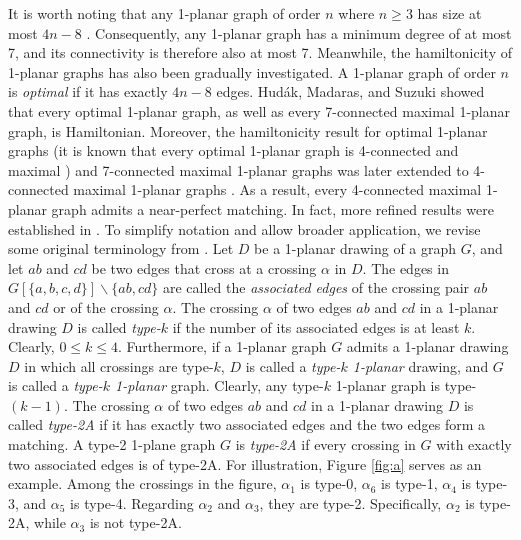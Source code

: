 \documentclass[12pt,a4paper]{article}
\begin{document}
 It is worth noting that  any 1-planar graph of order $n$ where $n \geq 3$ has size at most $4 n-8$  \cite{MR1606052}. Consequently, any 1-planar graph has a minimum degree of at most 7, and its connectivity is therefore also at most 7.  Meanwhile, the hamiltonicity of 1-planar graphs has also been gradually investigated.
A 1-planar graph of order $n$  is \emph{optimal} if it has exactly $4 n-8$ edges.  Hud\'{a}k, Madaras, and Suzuki \cite{MR2993519} showed that every optimal 1-planar graph, as well as every 7-connected maximal 1-planar graph, is Hamiltonian. Moreover, the hamiltonicity result for optimal 1-planar graphs (it is known that every optimal 1-planar graph is 4-connected and maximal \cite{MR2746706}) and 7-connected maximal 1-planar graphs was later extended to 4-connected maximal  1-planar  graphs \cite{MR4130388}. As a result, every 4-connected maximal 1-planar graph admits a near-perfect matching. In fact, more refined results were established in \cite{MR4130388}. To simplify notation and allow broader application, we revise some original terminology from \cite{MR4130388}. 
Let $D$ be a 1-planar drawing of a graph $G$, and let $ab$ and $cd$ be two edges that cross at a crossing $\alpha$ in $D$. The edges in $G[\{a, b, c, d\}] \backslash\{a b, c d\}$ are called the \emph{associated edges} of the crossing pair $a b$ and $c d$  or of the crossing $\alpha$. The crossing $\alpha$ of two edges $ab$ and $cd$ in a 1-planar drawing $D$ is called \emph{type-$k$} if the number of its associated edges is at least 
$k$.  Clearly,  $0\le k\le 4$. Furthermore, if a 1-planar graph $G$ admits a 1-planar drawing $D$ in which all crossings are type-$k$,  $D$ is called a \emph{type-$k$ 1-planar} drawing, and  $G$ is called a \emph{type-$k$ 1-planar} graph.  Clearly, any type-$k$ 1-planar graph is  type-$(k-1)$.    The crossing $\alpha$ of two edges $ab$ and $cd$ in a 1-planar drawing $D$ is called \emph{type-2A} if it has exactly two associated edges and the two edges form a matching. A type-2 1-plane graph $G$ is \emph{type-2A} if every crossing in $G$ with exactly two associated edges is of type-2A. For illustration, Figure \ref{fig:a} serves as an example.  Among the crossings in the figure, $\alpha_1$ is type-0, $\alpha_6$ is type-1, $\alpha_4$ is   type-3, and $\alpha_5$ is type-4. Regarding $\alpha_2$ and $\alpha_3$, they are  type-2. Specifically, $\alpha_2$ is  type-2A, while $\alpha_3$ is not type-2A. 
\end{document}
